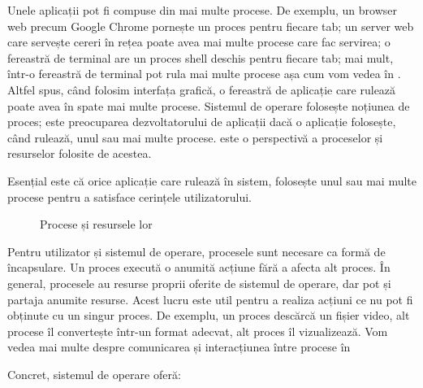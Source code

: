 Unele aplicații pot fi compuse din mai multe procese.
De exemplu, un browser web precum Google Chrome pornește un proces pentru fiecare tab;
un server web care servește cereri în rețea poate avea mai multe procese care fac servirea;
o fereastră de terminal are un proces shell deschis pentru fiecare tab;
mai mult, într-o fereastră de terminal pot rula mai multe procese așa cum vom vedea în .
Altfel spus, când folosim interfața grafică, o fereastră de aplicație care rulează poate avea în spate mai multe procese.
Sistemul de operare folosește noțiunea de proces;
este preocuparea dezvoltatorului de aplicații dacă o aplicație folosește, când rulează, unul sau mai multe procese.
 este o perspectivă a proceselor și resurselor folosite de acestea.

\begin{note}
  Esențial este că orice aplicație care rulează în sistem, folosește unul sau mai multe procese pentru a satisface cerințele utilizatorului.
\end{note}

\begin{figure}[!htbp]
  \centering
  \def\svgwidth{0.5\textwidth}
  
  \caption{Procese și resursele lor}
  \label{fig:process:overview}
\end{figure}

Pentru utilizator și sistemul de operare, procesele sunt necesare ca formă de încapsulare.
Un proces execută o anumită acțiune fără a afecta alt proces.
În general, procesele au resurse proprii oferite de sistemul de operare, dar pot și partaja anumite resurse.
Acest lucru este util pentru a realiza acțiuni ce nu pot fi obținute cu un singur proces.
De exemplu, un proces descărcă un fișier video, alt procese îl convertește într-un format adecvat, alt proces îl vizualizează.
Vom vedea mai multe despre comunicarea și interacțiunea între procese în 

Concret, sistemul de operare oferă:

